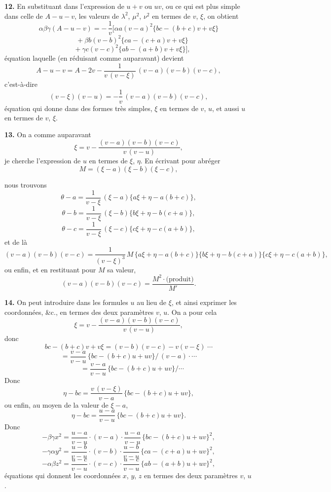 \documentclass[11pt,a4paper]{article}
\begin{document}
\textbf{12.} En substituant dans l'expression de $u + v$ ou $uv$, ou ce qui est plus simple dans celle de $A - u - v$, les valeurs de $\lambda^2$, $\mu^2$, $\nu^2$ en termes de $v$, $\xi$, on obtient
\[
\alpha\beta\gamma(A - u - v) = -\,\frac{1}{v}\Big[\alpha a(v - a)^2\{bc - (b + c)v + v\xi\}
\]
\[
\quad + \beta b(v - b)^2\{ca - (c + a)v + v\xi\}
\]
\[
\quad + \gamma c(v - c)^2\{ab - (a + b)v + v\xi\}\Big],
\]
\'equation laquelle (en r\'eduisant comme auparavant) devient
\[
A - u - v = A - 2v - \frac{1}{v\,(v - \xi)}\,(v - a)(v - b)(v - c),
\]
c'est-\`a-dire
\[
(v - \xi)(v - u) = -\frac{1}{v}\,(v - a)(v - b)(v - c),
\]
\'equation qui donne dans des formes tr\`es simples, $\xi$ en termes de $v$, $u$, et aussi $u$ en termes de $v$, $\xi$.

\textbf{13.} On a comme auparavant
\[
\xi = v - \frac{(v - a)(v - b)(v - c)}{v\,(v - u)},
\]
je cherche l'expression de $u$ en termes de $\xi$, $\eta$. En \'ecrivant pour abr\'eger
\[
M = (\xi - a)(\xi - b)(\xi - c),
\]

nous trouvons
\[
\theta - a = \frac{1}{v - \xi}\,(\xi - a)\{a\xi + \eta - a(b + c)\},
\]
\[
\theta - b = \frac{1}{v - \xi}\,(\xi - b)\{b\xi + \eta - b(c + a)\},
\]
\[
\theta - c = \frac{1}{v - \xi}\,(\xi - c)\{c\xi + \eta - c(a + b)\},
\]
et de l\`a
\[
(v - a)(v - b)(v - c) = \frac{1}{(v - \xi)^3}\,M\,\{a\xi + \eta - a(b + c)\}\{b\xi + \eta - b(c + a)\}\{c\xi + \eta - c(a + b)\},
\]
ou enfin, et en restituant pour $M$ sa valeur,
\[
(v - a)(v - b)(v - c) = \frac{M^2 \cdot \text{(produit)}}{M'}.
\]

\textbf{14.} On peut introduire dans les formules $u$ au lieu de $\xi$, et ainsi exprimer les coordonn\'ees, \&c., en termes des deux param\`etres $v$, $u$. On a pour cela
\[
\xi = v - \frac{(v - a)(v - b)(v - c)}{v\,(v - u)},
\]
donc
\[
bc - (b + c)v + v\xi = (v - b)(v - c) - v(v - \xi)\;\cdots
\]
\[
= \frac{v - a}{v - u}\,\{bc - (b + c)u + uv\}/\,(v - a)\cdot\cdots
\]
\[
\quad = \frac{v - a}{v - u}\,\{bc - (b + c)u + uv\}/\cdots
\]
Donc
\[
\eta - bc = \frac{v\,(v - \xi)}{v - a}\,\{bc - (b + c)u + uv\},
\]
ou enfin, au moyen de la valeur de $\xi - a$,
\[
\eta - bc = \frac{u - a}{v - u}\,\{bc - (b + c)u + uv\}.
\]
Donc
\[
-\beta\gamma x^2 = \frac{u - a}{v - u}\cdot(v - a)\cdot\frac{u - a}{v - u}\,\{bc - (b + c)u + uv\}^2,
\]
\[
-\gamma\alpha y^2 = \frac{u - b}{v - u}\cdot(v - b)\cdot\frac{u - b}{v - u}\,\{ca - (c + a)u + uv\}^2,
\]
\[
-\alpha\beta z^2 = \frac{u - c}{v - u}\cdot(v - c)\cdot\frac{u - c}{v - u}\,\{ab - (a + b)u + uv\}^2,
\]
\'equations qui donnent les coordonn\'ees $x$, $y$, $z$ en termes des deux param\`etres $v$, $u$.
\end{document}
